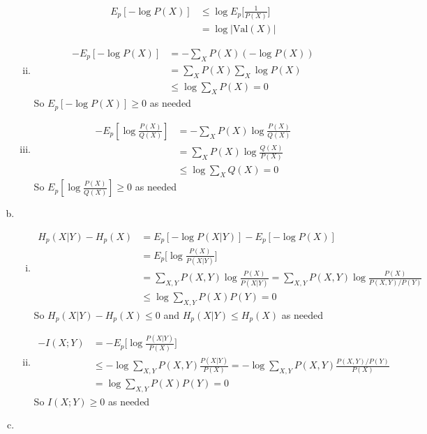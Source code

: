 \documentclass{article}
\begin{document}
\begin{enumerate}[(a)]
\begin{enumerate}[(i)]
\begin{align*}
            E_p[-\log P(X)] &\leq \log E_p \bigg[ \frac{1}{P(X)} \bigg] \\[0.5ex]
            &= \log |\text{Val}(X)|
        \end{align*}
        \item \begin{align*}
            - E_p[- \log P(X)] &= - \sum_{X} P(X) (-\log P(X)) \\
            &= \sum_{X} P(X) \sum_{X} \log P(X) \\
            &\leq \log \sum_{X} P(X) = 0
        \end{align*}
        So $E_p[- \log P(X)] \geq 0$ as needed 
        \item \begin{align*}
            - E_p[\log \frac{P(X)}{Q(X)}] &= - \sum_X P(X) \log \frac{P(X)}{Q(X)} \\
            &= \sum_X P(X) \log \frac{Q(X)}{P(X)} \\
            &\leq \log \sum_X Q(X) = 0
        \end{align*}
        So $E_p[\log \frac{P(X)}{Q(X)}] \geq 0$ as needed 
    \end{enumerate}
    \item \begin{enumerate}[(i)]
        \item \begin{align*}
            H_p(X|Y) - H_p(X) &= E_p[-\log P(X|Y)] - E_p[-\log P(X)] \\ 
            &= E_p\bigg[\log \frac{P(X)}{P(X|Y)}\bigg] \\
            &= \sum_{X, Y} P(X, Y) \log \frac{P(X)}{P(X|Y)} = \sum_{X, Y} P(X, Y) \log \frac{P(X)}{P(X, Y)/P(Y)}\\
            &\leq \log \sum_{X,Y} P(X)P(Y) = 0
        \end{align*}
        So $H_p(X|Y) - H_p(X) \leq 0$ and $H_p(X|Y) \leq H_p(X)$ as needed 
        \item \begin{align*}
            -I(X;Y) &= -E_p\bigg[\log \frac{P(X|Y)}{P(X)}\bigg] \\
            &\leq -\log \sum_{X, Y} P(X, Y) \frac{P(X|Y)}{P(X)} = -\log \sum_{X, Y} P(X, Y)\frac{P(X,Y)/P(Y)}{P(X)} \\
            &= \log \sum_{X, Y}P(X)P(Y) = 0
        \end{align*}
        So $I(X;Y) \geq 0$ as needed
    \end{enumerate}
    \item  \begin{enumerate}[(i)]

\end{enumerate}
\end{enumerate}
\end{document}

